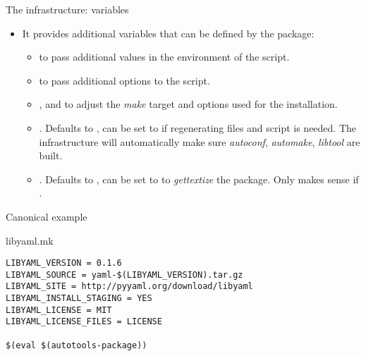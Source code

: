 \begin{frame}{The  infrastructure: variables}
  \begin{itemize}
  \item It provides additional variables that can be defined by the
    package:
    \begin{itemize}
    \item {} to pass additional values in the
      environment of the  script.
    \item {} to pass additional options to the
       script.
    \item {}, 
      and  to adjust the {\em make}
      target and options used for the installation.
    \item {}. Defaults to , can be set
      to  if regenerating  files and
       script is needed. The infrastructure will
      automatically make sure {\em autoconf}, {\em automake}, {\em
        libtool} are built.
    \item {}. Defaults to , can be set
      to  to {\em gettextize} the package. Only makes sense
      if .
    \end{itemize}
  \end{itemize}
\end{frame}

\begin{frame}[fragile]{Canonical  example}
  \begin{block}{libyaml.mk}
    \begin{verbatim}
LIBYAML_VERSION = 0.1.6
LIBYAML_SOURCE = yaml-$(LIBYAML_VERSION).tar.gz
LIBYAML_SITE = http://pyyaml.org/download/libyaml
LIBYAML_INSTALL_STAGING = YES
LIBYAML_LICENSE = MIT
LIBYAML_LICENSE_FILES = LICENSE

$(eval $(autotools-package))
    \end{verbatim}
  \end{block}
\end{frame}

